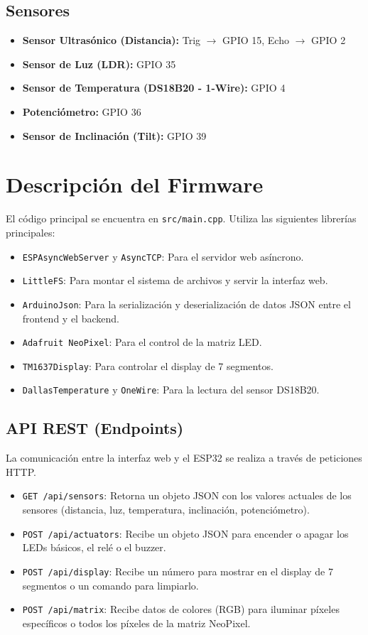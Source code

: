 \documentclass[12pt,a4paper]{article}
\begin{document}
\subsection{Sensores}
\begin{itemize}
    \item \textbf{Sensor Ultrasónico (Distancia):} Trig $\rightarrow$ GPIO 15, Echo $\rightarrow$ GPIO 2
    \item \textbf{Sensor de Luz (LDR):} GPIO 35
    \item \textbf{Sensor de Temperatura (DS18B20 - 1-Wire):} GPIO 4
    \item \textbf{Potenciómetro:} GPIO 36
    \item \textbf{Sensor de Inclinación (Tilt):} GPIO 39
\end{itemize}

\section{Descripción del Firmware}
El código principal se encuentra en \texttt{src/main.cpp}. Utiliza las siguientes librerías principales:
\begin{itemize}
    \item \texttt{ESPAsyncWebServer} y \texttt{AsyncTCP}: Para el servidor web asíncrono.
    \item \texttt{LittleFS}: Para montar el sistema de archivos y servir la interfaz web.
    \item \texttt{ArduinoJson}: Para la serialización y deserialización de datos JSON entre el frontend y el backend.
    \item \texttt{Adafruit NeoPixel}: Para el control de la matriz LED.
    \item \texttt{TM1637Display}: Para controlar el display de 7 segmentos.
    \item \texttt{DallasTemperature} y \texttt{OneWire}: Para la lectura del sensor DS18B20.
\end{itemize}

\subsection{API REST (Endpoints)}
La comunicación entre la interfaz web y el ESP32 se realiza a través de peticiones HTTP.
\begin{itemize}
    \item \texttt{GET /api/sensors}: Retorna un objeto JSON con los valores actuales de los sensores (distancia, luz, temperatura, inclinación, potenciómetro).
    \item \texttt{POST /api/actuators}: Recibe un objeto JSON para encender o apagar los LEDs básicos, el relé o el buzzer.
    \item \texttt{POST /api/display}: Recibe un número para mostrar en el display de 7 segmentos o un comando para limpiarlo.
    \item \texttt{POST /api/matrix}: Recibe datos de colores (RGB) para iluminar píxeles específicos o todos los píxeles de la matriz NeoPixel.
\end{itemize}
\end{document}
